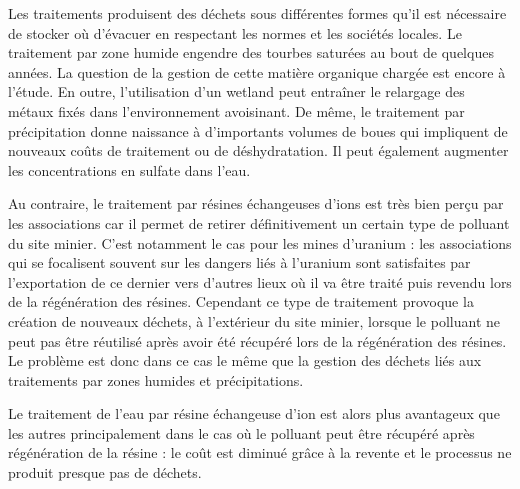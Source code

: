 \documentclass{article}
\begin{document}
Les traitements produisent des déchets sous différentes formes qu’il est nécessaire de stocker où d’évacuer en respectant les normes et les sociétés locales. Le traitement par zone humide engendre des tourbes saturées au bout de quelques années. La question de la gestion de cette matière organique chargée est encore à l’étude. En outre, l’utilisation d’un wetland peut entraîner le relargage des métaux fixés dans l’environnement avoisinant. De même, le traitement par précipitation donne naissance à d’importants volumes de boues qui impliquent de nouveaux coûts de traitement ou de déshydratation. Il peut également augmenter les concentrations en sulfate dans l’eau. 

Au contraire, le traitement par résines échangeuses d’ions est très bien perçu par les associations car il permet de retirer définitivement un certain type de polluant du site minier. C’est notamment le cas pour les mines d’uranium : les associations qui se focalisent souvent sur les dangers liés à l’uranium sont satisfaites par l’exportation de ce dernier vers d’autres lieux où il va être traité puis revendu lors de la régénération des résines. Cependant ce type de traitement provoque la création de nouveaux déchets, à l’extérieur du site minier, lorsque le polluant ne peut pas être réutilisé après avoir été récupéré lors de la régénération des résines. Le problème est donc dans ce cas le même que la gestion des déchets liés aux traitements par zones humides et précipitations.

Le traitement de l’eau par résine échangeuse d’ion est alors plus avantageux que les autres principalement dans le cas où le polluant peut être récupéré après régénération de la résine : le coût est diminué grâce à la revente et le processus ne produit presque pas de déchets.

\end{document}
